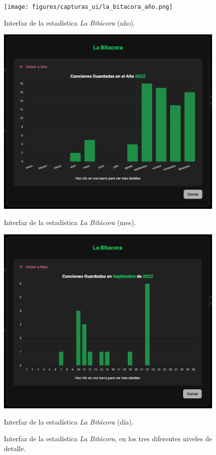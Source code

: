 \begin{figure}[H]
  \centering
  \vspace{-10pt}
  \begin{minipage}{0.32\textwidth}
    \centering
    \texttt{[image: figures/capturas\_ui/la\_bitacora\_año.png]}
    \caption{Interfaz de la estadística \textit{La Bitácora} (año).}
    \label{fig:la_bitacora_año}
  \end{minipage}
  \begin{minipage}{0.32\textwidth}
    \centering
    \includegraphics[width=\textwidth]{figures/capturas_ui/la_bitacora_mes.png}
    \caption{Interfaz de la estadística \textit{La Bitácora} (mes).}
    \label{fig:la_bitacora_mes}
  \end{minipage}
  \begin{minipage}{0.32\textwidth}
    \centering
    \includegraphics[width=\textwidth]{figures/capturas_ui/la_bitacora_dia.png}
    \caption{Interfaz de la estadística \textit{La Bitácora} (día).}
    \label{fig:la_bitacora_dia}
  \end{minipage}
  \caption{Interfaz de la estadística \textit{La Bitácora}, en los tres diferentes niveles de detalle.}
  \label{fig:la_bitacora}
\end{figure}

